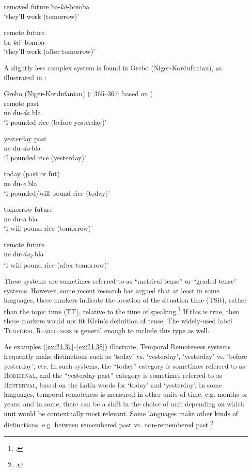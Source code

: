 \ex  removed future  
 ba-\textit{kà}-bomba  \\ 
\glt‘they’ll work (tomorrow)’

\ex  remote future   \\
ba-\textit{ká} -bomba   \\
\glt ‘they’ll work (after tomorrow)’
\z
\z

A slightly less complex system is found in Grebo (Niger-Kordufanian), as illustrated in :

\ea \label{ex:21.38} 
Grebo (Niger-Kordufanian) (\citealt{Frawley1992}: 365–367; based on \citet{Innes1966}) \\
\ea  remote past \\
ne du-\textit{da} bla \\ 
\glt‘I pounded rice (before yesterday)’

\ex yesterday past\\
ne du-\textit{də} bla\\
\glt ‘I pounded rice (yesterday)’ 

\ex today (past or fut) \\
ne du-\textit{e} bla \\ 
\glt‘I pounded/will pound rice (today)’

\ex tomorrow future \\
ne du-\textit{a} bla \\
\glt‘I will pound rice (tomorrow)’

\ex remote future \\
ne du-\textit{də\textsubscript{2}} bla \\ 
\glt‘I will pound rice (after tomorrow)’
\z
\z

These systems are sometimes referred to as “metrical tense” or “graded tense” systems. However, some recent research has argued that at least in some languages, these markers indicate the location of the situation time (TSit), rather than the topic time (TT), relative to the time of speaking.\footnote{\citet{Cable2013,LaCross2016}.} If this is true, then these markers would not fit Klein’s definition of tense. The widely-used label \textsc{Temporal Remoteness} is general enough to include this type as well.



As examples (\ref{ex:21.37}--\ref{ex:21.38}) illustrate, Temporal Remoteness systems frequently make distinctions such as ‘today’ vs. ‘yesterday’, ‘yesterday’ vs. ‘before yesterday’, etc. In such systems, the “today” category is sometimes referred to as \textsc{Hodiernal}, and the “yesterday past” category is sometimes referred to as \textsc{Hesternal}, based on the Latin words for ‘today’ and ‘yesterday’. In some languages, temporal remoteness is measured in other units of time, e.g. months or years; and in some, there can be a shift in the choice of unit depending on which unit would be contextually most relevant. Some languages make other kinds of distinctions, e.g. between remembered past vs. non-remembered past.\footnote{\citet{Botne2012}.}



